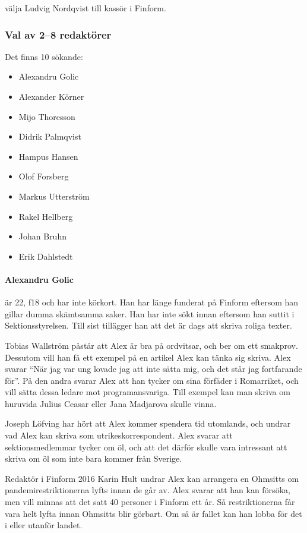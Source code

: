 \documentclass[hidelinks]{sektionsmote}
\begin{document}
\begin{beslut}
  \item välja Ludvig Nordqvist till kassör i Finform.
\end{beslut}


\subsubsection{Val av 2--8 redaktörer}
Det finns 10 sökande:
\begin{itemize}
    \item Alexandru Golic
    \item Alexander Körner
    \item Mijo Thoresson
    \item Didrik Palmqvist
    \item Hampus Hansen
    \item Olof Forsberg
    \item Markus Utterström
    \item Rakel Hellberg
    \item Johan Bruhn
    \item Erik Dahlstedt
\end{itemize}

\paragraph{Alexandru Golic} är 22, f18 och har inte körkort.
Han har länge funderat på Finform eftersom han gillar dumma skämtsamma saker.
Han har inte sökt innan eftersom han suttit i Sektionsstyrelsen.
Till sist tillägger han att det är dags att skriva roliga texter.

Tobias Wallström påstår att Alex är bra på ordvitsar, och ber om ett smakprov.
Dessutom vill han få ett exempel på en artikel Alex kan tänka sig skriva.
Alex svarar \enquote{När jag var ung lovade jag att inte sätta mig, och det står jag fortfarande för}.
På den andra svarar Alex att han tycker om sina förfäder i Romarriket, och vill sätta dessa ledare mot programansvariga.
Till exempel kan man skriva om huruvida Julius Ceasar eller Jana Madjarova skulle vinna.

Joseph Löfving har hört att Alex kommer spendera tid utomlands, och undrar vad Alex kan skriva som utrikeskorrespondent.
Alex svarar att sektionsmedlemmar tycker om öl, och att det därför skulle vara intressant att skriva om öl som inte bara kommer från  Sverige.

Redaktör i Finform 2016 Karin Hult undrar Alex kan arrangera en Ohmsitts om pandemirestriktionerna lyfts innan de går av.
Alex svarar att han kan försöka, men vill minnas att det satt 40 personer i Finform ett år.
Så restriktionerna får vara helt lyfta innan Ohmsitts blir görbart.
Om så är fallet kan han lobba för det i eller utanför landet.
\end{document}
